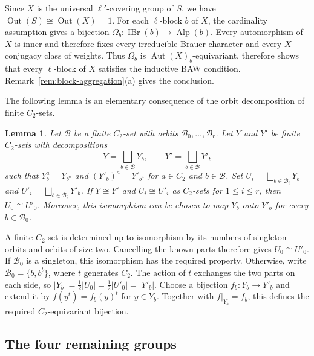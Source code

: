 \documentclass[10pt]{amsart}
\newtheorem{lemma}[theorem]{Lemma}
\theoremstyle{definition}
\renewcommand{\leq}{\leqslant}
\let\oldendproof\endproof
\renewenvironment{proof}[1][\proofname]{%
  \oldproof[\bfseries #1]%
}{\oldendproof}
\DeclareMathOperator{\Aut}{Aut}
\DeclareMathOperator{\Out}{Out}
\DeclareMathOperator{\IBr}{IBr}
\DeclareMathOperator{\Alp}{Alp}
\numberwithin{equation}{section}
\numberwithin{table}{section}
\begin{document}
\begin{proof}
Since $X$ is the universal $\ell'$-covering group of $S$, we have
$\Out(S)\cong\Out(X)=1$. For each $\ell$-block $b$ of $X$, the
cardinality assumption gives a bijection
$\Omega_b:\IBr(b)\longrightarrow\Alp(b)$.
Every automorphism of $X$ is inner and therefore fixes every
irreducible Brauer character and every $X$-conjugacy class of weights.
Thus $\Omega_b$ is $\Aut(X)_b$-equivariant.
\cite[Corollary~2.13]{FengLiZhang2019} therefore shows that every
$\ell$-block of $X$ satisfies the inductive BAW condition. Remark~\ref{rem:block-aggregation}\textup{(a)} gives the conclusion.
\end{proof}

The following lemma is an elementary consequence of the orbit decomposition
of finite $C_2$-sets.

\begin{lemma}\label{lem:block-cancellation}
Let $\mathcal B$ be a finite $C_2$-set with orbits
$\mathcal B_0,\ldots,\mathcal B_r$. Let $Y$ and $Y'$ be finite
$C_2$-sets with decompositions
\[
 Y=\bigsqcup_{b\in\mathcal B}Y_b,\qquad
 Y'=\bigsqcup_{b\in\mathcal B}Y'_b
\]
such that $Y_b^a=Y_{b^a}$ and $(Y'_b)^a=Y'_{b^a}$ for
$a\in C_2$ and $b\in\mathcal B$.
Set $U_i=\bigsqcup_{b\in\mathcal B_i}Y_b$ and
$U'_i=\bigsqcup_{b\in\mathcal B_i}Y'_b$.
If $Y\cong Y'$ and $U_i\cong U'_i$ as $C_2$-sets for
$1\leq i\leq r$, then $U_0\cong U'_0$.
Moreover, this isomorphism can be chosen to map $Y_b$ onto $Y'_b$
for every $b\in\mathcal B_0$.
\end{lemma}

\begin{proof}
A finite $C_2$-set is determined up to isomorphism by its numbers
of singleton orbits and orbits of size two. Cancelling the known
parts therefore gives $U_0\cong U'_0$.
If $\mathcal B_0$ is a singleton, this isomorphism has the required
property. Otherwise, write $\mathcal B_0=\{b,b^t\}$, where $t$
generates $C_2$. The action of $t$ exchanges the two parts on
each side, so $|Y_b|=\tfrac12|U_0|=\tfrac12|U'_0|=|Y'_b|$.
Choose a bijection $f_b:Y_b\to Y'_b$ and extend it by
$f(y^t)=f_b(y)^t$ for $y\in Y_b$.
Together with $f|_{Y_b}=f_b$, this defines the required
$C_2$-equivariant bijection.
\end{proof}

\subsection{The four remaining groups}
\end{document}
